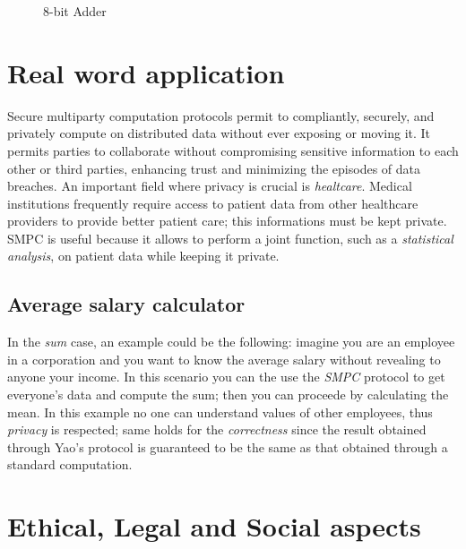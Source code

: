 \documentclass[12pt]{article}
\begin{document}
\begin{figure}[!h]
    \caption{8-bit Adder}\label{circuit}
\end{figure}

\section{Real word application}\label{sec:world}
Secure multiparty computation protocols permit to compliantly, securely, and privately compute on distributed data without ever exposing or moving it. It permits parties to collaborate without compromising sensitive information to each other or third parties, enhancing trust and minimizing the episodes of data breaches. An important field where privacy is crucial is \textit{healtcare}. Medical institutions frequently require access to patient data from other healthcare providers to provide better patient care; this informations must be kept private. SMPC is useful because it allows to perform a joint function, such as a \textit{statistical analysis}, on patient data while keeping it private.
\subsection{Average salary calculator}
In the \textit{sum} case, an example could be the following: imagine you are an employee in a corporation and you want to know the average salary without revealing to anyone your income. In this scenario you can the use the \textit{SMPC} protocol to get everyone's data and compute the sum; then you can proceede by calculating the mean. In this example no one can understand values of other employees, thus \textit{privacy} is respected; same holds for the \textit{correctness} since the result obtained through Yao's protocol is guaranteed to be the same as that obtained through a standard computation.
\section{Ethical, Legal and Social aspects}\label{sec:sel}
\end{document}
